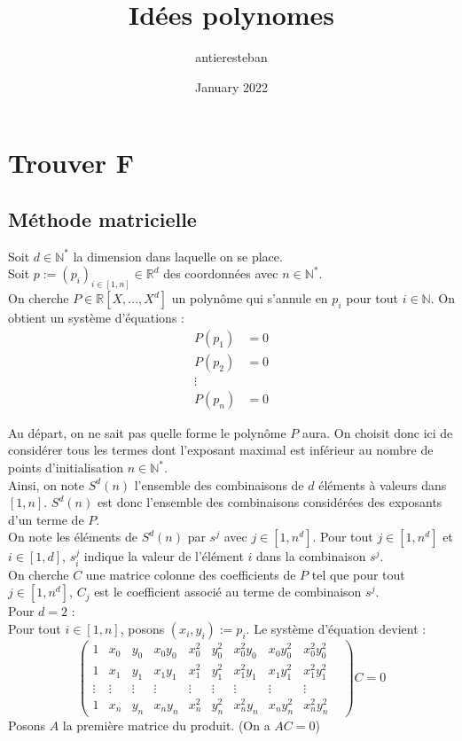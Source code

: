 \documentclass{article}
\title{Idées polynomes}
\author{antieresteban}
\date{January 2022}
\begin{document}
	\section{Trouver F}
	\subsection{Méthode matricielle}
	Soit $d\in\mathbb{N}^*$ la dimension dans laquelle on se place.\\
	Soit $p:=(p_i)_{i\in[1,n]}\in\mathbb{R}^d$ des coordonnées avec $n\in\mathbb{N}^*$.\\
	On cherche $P\in \mathbb{R}[X,...,X^d]$ un polynôme qui s'annule en $p_i$ pour tout $i\in\mathbb{N}$. On obtient un système d'équations :
	\begin{align*}
		P(p_1)&=0\\
		P(p_2)&=0\\
		\vdots \\
		P(p_n)&=0
	\end{align*}
	
	Au départ, on ne sait pas quelle forme le polynôme $P$ aura. On choisit donc ici de considérer tous les termes dont l'exposant maximal est inférieur au nombre de points d'initialisation $n\in\mathbb{N}^*$.\\
	
	
	
	Ainsi, on note $S^d(n)$ l'ensemble des combinaisons de $d$ éléments à valeurs dans $[1,n]$. $S^d(n)$ est donc l'ensemble des combinaisons considérées des exposants d'un terme de $P$.\\
	On note les éléments de $S^d(n)$ par $s^j$ avec $j\in [1,n^d]$. Pour tout $j\in [1,n^d]$ et $i\in[1,d]$, $s^j_i$ indique la valeur de l'élément $i$ dans la combinaison $s^j$. \\
	On cherche $C$ une matrice colonne des coefficients de $P$ tel que pour tout $j\in[1,n^d]$, $C_j$ est le coefficient associé au terme de combinaison $s^j$.\\
	
	
	Pour $d=2$ :\\
	Pour tout $i\in[1,n]$, posons $(x_i,y_i):=p_i$.
	Le système d'équation devient :
	\begin{equation}
		\begin{pmatrix}
			1 & x_0 & y_0 & x_0 y_0 & x_0^2 & y_0^2 & x_0^2 y_0 & x_0 y_0^2 & x_0^2 y_0^2\\
			1 & x_1 & y_1 & x_1 y_1 & x_1^2 & y_1^2 & x_1^2 y_1 & x_1 y_1^2 & x_1^2 y_1^2\\ 
			\vdots & \vdots &\vdots &\vdots &\vdots &\vdots &\vdots &\vdots &\vdots &\\
			1 & x_n & y_n & x_n y_n & x_n^2 & y_n^2 & x_n^2 y_n & x_n y_n^2 & x_n^2 y_n^2
		\end{pmatrix}
		C = 0
	\end{equation}  
	Posons $A$ la première matrice du produit. (On a $AC=0$)
	
\end{document}
